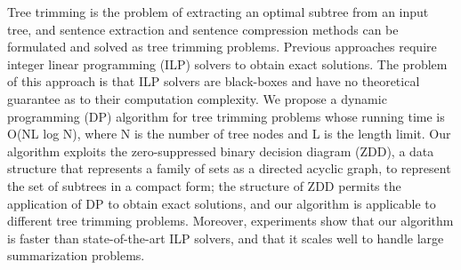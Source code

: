 Tree trimming is the problem of extracting an optimal subtree from an input tree, and sentence extraction and sentence compression methods can be formulated and solved as tree trimming problems. Previous approaches require integer linear programming (ILP) solvers to obtain exact solutions. The problem of this approach is that ILP solvers are black-boxes and have no theoretical guarantee as to their computation complexity.  We propose a dynamic programming (DP) algorithm for tree trimming problems whose running time is O(NL log N), where N is the number of tree nodes and L is the length limit.  Our algorithm exploits the zero-suppressed binary decision diagram (ZDD), a data structure that represents a family of sets as a directed acyclic graph, to represent the set of subtrees in a compact form; the structure of ZDD permits the application of DP to obtain exact solutions, and our algorithm is applicable to different tree trimming problems.  Moreover, experiments show that our algorithm is faster than state-of-the-art ILP solvers, and that it scales well to handle large summarization problems.
